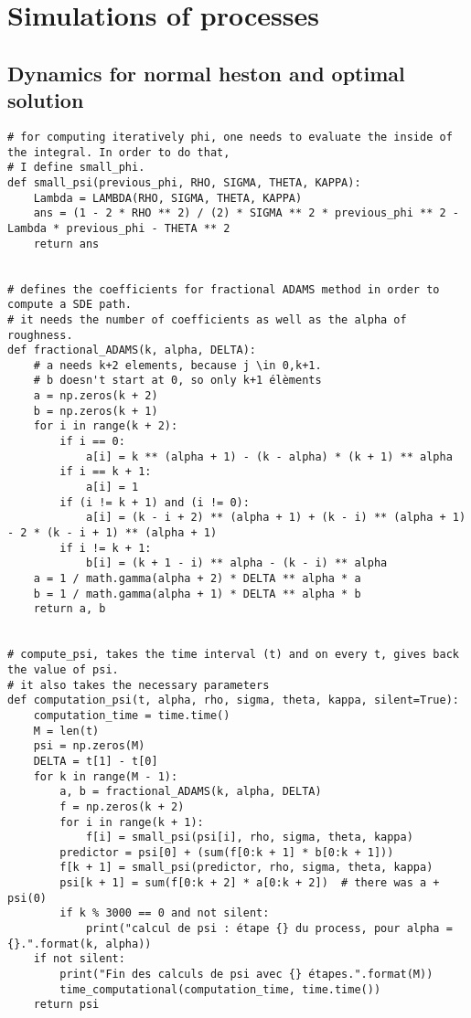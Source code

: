 \section{Simulations of processes}


\subsection{Dynamics for normal heston and optimal solution}
\begin{Verbatim}[fontsize=\tiny]
# for computing iteratively phi, one needs to evaluate the inside of the integral. In order to do that,
# I define small_phi.
def small_psi(previous_phi, RHO, SIGMA, THETA, KAPPA):
    Lambda = LAMBDA(RHO, SIGMA, THETA, KAPPA)
    ans = (1 - 2 * RHO ** 2) / (2) * SIGMA ** 2 * previous_phi ** 2 - Lambda * previous_phi - THETA ** 2
    return ans


# defines the coefficients for fractional ADAMS method in order to compute a SDE path.
# it needs the number of coefficients as well as the alpha of roughness.
def fractional_ADAMS(k, alpha, DELTA):
    # a needs k+2 elements, because j \in 0,k+1.
    # b doesn't start at 0, so only k+1 élèments
    a = np.zeros(k + 2)
    b = np.zeros(k + 1)
    for i in range(k + 2):
        if i == 0:
            a[i] = k ** (alpha + 1) - (k - alpha) * (k + 1) ** alpha
        if i == k + 1:
            a[i] = 1
        if (i != k + 1) and (i != 0):
            a[i] = (k - i + 2) ** (alpha + 1) + (k - i) ** (alpha + 1) - 2 * (k - i + 1) ** (alpha + 1)
        if i != k + 1:
            b[i] = (k + 1 - i) ** alpha - (k - i) ** alpha
    a = 1 / math.gamma(alpha + 2) * DELTA ** alpha * a
    b = 1 / math.gamma(alpha + 1) * DELTA ** alpha * b
    return a, b


# compute_psi, takes the time interval (t) and on every t, gives back the value of psi.
# it also takes the necessary parameters
def computation_psi(t, alpha, rho, sigma, theta, kappa, silent=True):
    computation_time = time.time()
    M = len(t)
    psi = np.zeros(M)
    DELTA = t[1] - t[0]
    for k in range(M - 1):
        a, b = fractional_ADAMS(k, alpha, DELTA)
        f = np.zeros(k + 2)
        for i in range(k + 1):
            f[i] = small_psi(psi[i], rho, sigma, theta, kappa)
        predictor = psi[0] + (sum(f[0:k + 1] * b[0:k + 1]))
        f[k + 1] = small_psi(predictor, rho, sigma, theta, kappa)
        psi[k + 1] = sum(f[0:k + 2] * a[0:k + 2])  # there was a + psi(0)
        if k % 3000 == 0 and not silent:
            print("calcul de psi : étape {} du process, pour alpha = {}.".format(k, alpha))
    if not silent:
        print("Fin des calculs de psi avec {} étapes.".format(M))
        time_computational(computation_time, time.time())
    return psi



\end{Verbatim}

